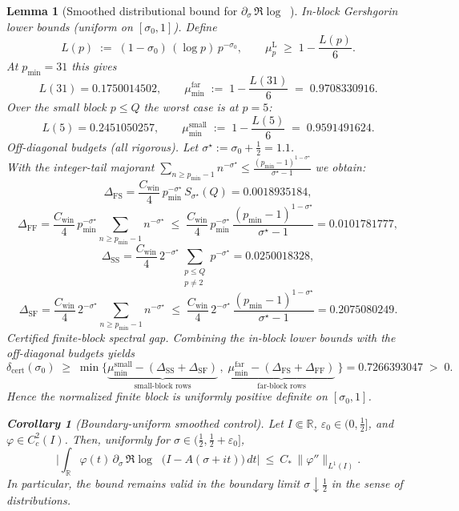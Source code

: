 \documentclass[11pt]{article}
\newtheorem{lemma}[theorem]{Lemma}
\newtheorem{corollary}[theorem]{Corollary}
\theoremstyle{definition}
\theoremstyle{remark}
\newcommand{\R}{\mathbb{R}}
\DeclareMathOperator{\dettwo}{det_2}
\begin{document}
\begin{lemma}[Smoothed distributional bound for $\partial_\sigma\,\Re\log\dettwo$]
\noindent\emph{In-block Gershgorin lower bounds (uniform on \([\sigma_0,1]\)).}
Define
\[
L(p)\;:=\;(1-\sigma_0)\,(\log p)\,p^{-\sigma_0},\qquad 
\mu_p^{\mathrm L}\;\ge\;1-\frac{L(p)}{6}.
\]
At \(p_{\min}=31\) this gives
\[
L(31)=0.1750014502,\qquad 
\mu_{\min}^{\mathrm{far}}\;:=\;1-\frac{L(31)}{6}\;=\;0.9708330916.
\]
Over the small block \(p\le Q\) the worst case is at \(p=5\):
\[
L(5)=0.2451050257,\qquad 
\mu_{\min}^{\mathrm{small}}\;:=\;1-\frac{L(5)}{6}\;=\;0.9591491624.
\]
\noindent\emph{Off-diagonal budgets (all rigorous).}
Let \(\sigma^\star:=\sigma_0+\tfrac12=1.1\).\\
With the integer-tail majorant \(\displaystyle \sum_{n\ge p_{\min}-1} n^{-\sigma^\star}\le
\frac{(p_{\min}-1)^{1-\sigma^\star}}{\sigma^\star-1}\)
we obtain:
\[
\Delta_{\mathrm{FS}}
=\frac{C_{\mathrm{win}}}{4}\,p_{\min}^{-\sigma^\star}\,S_{\sigma^\star}(Q)
=0.0018935184,
\]
\[
\Delta_{\mathrm{FF}}
=\frac{C_{\mathrm{win}}}{4}\,p_{\min}^{-\sigma^\star}\!
\sum_{n\ge p_{\min}-1}\! n^{-\sigma^\star}
\;\le\;\frac{C_{\mathrm{win}}}{4}\,p_{\min}^{-\sigma^\star}\,
\frac{(p_{\min}-1)^{1-\sigma^\star}}{\sigma^\star-1}
=0.0101781777,
\]
\[
\Delta_{\mathrm{SS}}
=\frac{C_{\mathrm{win}}}{4}\,2^{-\sigma^\star}
\!\sum_{\substack{p\le Q\\ p\neq 2}}\! p^{-\sigma^\star}
=0.0250018328,
\]
\[
\Delta_{\mathrm{SF}}
=\frac{C_{\mathrm{win}}}{4}\,2^{-\sigma^\star}\!
\sum_{n\ge p_{\min}-1}\! n^{-\sigma^\star}
\;\le\;\frac{C_{\mathrm{win}}}{4}\,2^{-\sigma^\star}\,
\frac{(p_{\min}-1)^{1-\sigma^\star}}{\sigma^\star-1}
=0.2075080249.
\]
\noindent\emph{Certified finite-block spectral gap.}
Combining the in-block lower bounds with the off-diagonal budgets yields
\[
\delta_{\mathrm{cert}}(\sigma_0)\;\ge\;
\min\Big\{
\underbrace{\mu_{\min}^{\mathrm{small}}-(\Delta_{\mathrm{SS}}+\Delta_{\mathrm{SF}})}_{\text{small-block rows}}\,,\;
\underbrace{\mu_{\min}^{\mathrm{far}}-(\Delta_{\mathrm{FS}}+\Delta_{\mathrm{FF}})}_{\text{far-block rows}}\
\Big\}
=0.7266393047\;>\;0.
\]
Hence the normalized finite block is uniformly positive definite on \([\sigma_0,1]\).
\begin{corollary}[Boundary-uniform smoothed control]\label{cor:det2-boundary}
Let $I\Subset\R$, $\varepsilon_0\in(0,\tfrac12]$, and $\varphi\in C_c^2(I)$. Then, uniformly for $\sigma\in(\tfrac12,\tfrac12+\varepsilon_0]$,
\[
  \Big|\int_{\R} \varphi(t)\,\partial_\sigma\,\Re\log\dettwo\big(I-A(\sigma+it)\big)\,dt\Big|\ \le\ C_*\,\|\varphi''\|_{L^1(I)}.
\]
In particular, the bound remains valid in the boundary limit $\sigma\downarrow \tfrac12$ in the sense of distributions.
\end{corollary}

\end{lemma}
\end{document}
